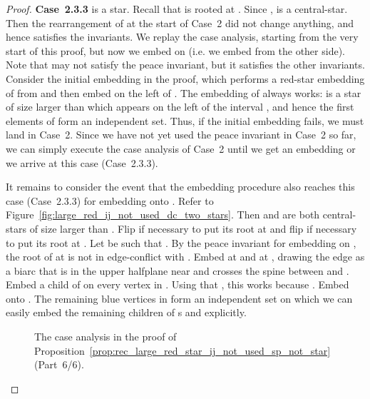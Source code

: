 \documentclass[11pt,a4paper,colorlinks=true,urlcolor=blue,citecolor=red]{article}
\theoremstyle{plain}
\newcommand{\case}[1]{\par\vspace{.5\baselineskip}\noindent\textbf{\sffamily Case~#1}}
\begin{document}
\begin{proof}
  \case{2.3.3}  is a star. Recall that  is rooted at
  . Since ,  is a central-star.
  Then the rearrangement of  at the start of Case~2 did not
  change anything, and hence  satisfies the invariants. We replay the
  case analysis, starting from the very start of this proof, but now we
  embed on  (i.e. we embed from the other side). Note
  that  may not satisfy the peace invariant, but it satisfies
  the other invariants. Consider the initial embedding in the proof,
  which performs a red-star embedding of  from  and then
  embed  on the left of . The embedding of  always
  works:  is a star of size larger than  which appears on
  the left of the interval , and hence the first 
  elements of  form an independent set. Thus, if the initial
  embedding fails, we must land in Case~2. Since we have not yet used
  the peace invariant in Case~2 so far, we can simply execute the case
  analysis of Case~2 until we get an embedding or we arrive at this case
  (Case~2.3.3).

  It remains to consider the event that the embedding procedure also
  reaches this case (Case~2.3.3) for embedding  onto . Refer
  to Figure~\ref{fig:large_red_ij_not_used_dc_two_stars}. Then
   and  are both central-stars of size larger
  than . Flip  if necessary to put its root at 
  and flip  if necessary to put its root at . Let  be
  such that . By the peace invariant for embedding
   on , the root of  at  is not in
  edge-conflict with . Embed  at  and  at , drawing the
  edge  as a biarc that is in the upper halfplane near  and
  crosses the spine between  and . Embed a child of  on
  every vertex in . Using that
  , this works because
  .
  Embed  onto . The remaining blue vertices in  form an
  independent set on which we can easily embed the remaining children of
  s  and  explicitly.

  \begin{figure}
    \centering {}\caption{The case analysis in the proof of
      Proposition~\ref{prop:rec_large_red_star_ij_not_used_sp_not_star}~(Part~6/6).}
  \end{figure}
\end{proof}
\end{document}
